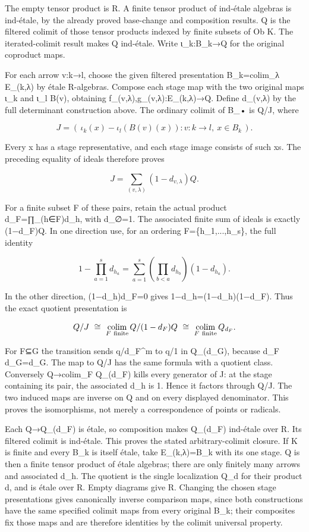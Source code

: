 The empty tensor product is R. A finite tensor product of ind-étale algebras is ind-étale, by the already proved base-change and composition results. Q is the filtered colimit of those tensor products indexed by finite subsets of Ob K. The iterated-colimit result makes Q ind-étale. Write ι\_k:B\_k→Q for the original coproduct maps.

For each arrow v:k→l, choose the given filtered presentation B\_k=colim\_λ E\_(k,λ) by étale R-algebras. Compose each stage map with the two original maps ι\_k and ι\_l B(v), obtaining f\_(v,λ),g\_(v,λ):E\_(k,λ)→Q. Define d\_(v,λ) by the full determinant construction above. The ordinary colimit of B\_• is Q/J, where

\[
J=(\,\iota_k(x)-\iota_l(B(v)(x)):
                    v:k\to l,\ x\in B_k\,).
\]

Every x has a stage representative, and each stage image consists of such x\textquotesingle s. The preceding equality of ideals therefore proves

\[
J=\sum_{(v,\lambda)}(1-d_{v,\lambda})Q.
\]

For a finite subset F of these pairs, retain the actual product d\_F=∏\_(h∈F)d\_h, with d\_∅=1. The associated finite sum of ideals is exactly (1−d\_F)Q. In one direction use, for an ordering F=\{h\_1,...,h\_s\}, the full identity

\[
1-\prod_{a=1}^s d_{h_a}
 =\sum_{a=1}^s\left(\prod_{b<a}d_{h_b}\right)(1-d_{h_a}).
\]

In the other direction, (1−d\_h)d\_F=0 gives 1−d\_h=(1−d\_h)(1−d\_F). Thus the exact quotient presentation is

\[
Q/J\ \cong\ \mathop{\rm colim}_{F\ {\rm finite}}
     Q/(1-d_F)Q
\ \cong\ \mathop{\rm colim}_{F\ {\rm finite}} Q_{d_F}.
\]

For F⊆G the transition sends q/d\_F\^{}m to q/1 in Q\_(d\_G), because d\_F d\_G=d\_G. The map to Q/J has the same formula with a quotient class. Conversely Q→colim\_F Q\_(d\_F) kills every generator of J: at the stage containing its pair, the associated d\_h is 1. Hence it factors through Q/J. The two induced maps are inverse on Q and on every displayed denominator. This proves the isomorphisms, not merely a correspondence of points or radicals.

Each Q→Q\_(d\_F) is étale, so composition makes Q\_(d\_F) ind-étale over R. Its filtered colimit is ind-étale. This proves the stated arbitrary-colimit closure. If K is finite and every B\_k is itself étale, take E\_(k,λ)=B\_k with its one stage. Q is then a finite tensor product of étale algebras; there are only finitely many arrows and associated d\_h. The quotient is the single localization Q\_d for their product d, and is étale over R. Empty diagrams give R. Changing the chosen stage presentations gives canonically inverse comparison maps, since both constructions have the same specified colimit maps from every original B\_k; their composites fix those maps and are therefore identities by the colimit universal property.

